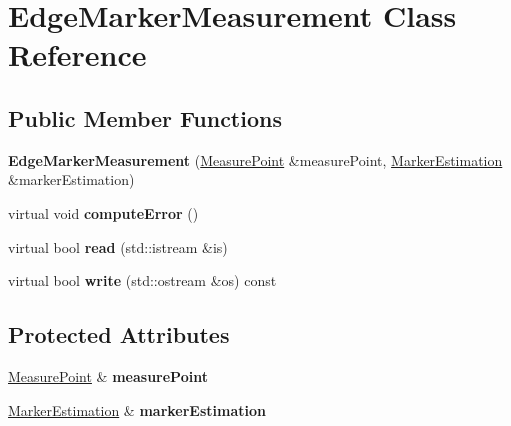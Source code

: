 \hypertarget{classEdgeMarkerMeasurement}{\section{\-Edge\-Marker\-Measurement \-Class \-Reference}
\label{classEdgeMarkerMeasurement}
}
\subsection*{\-Public \-Member \-Functions}
\begin{DoxyCompactItemize}
\item 
\hypertarget{classEdgeMarkerMeasurement_a66b96b376f59572a10bf25ea45989418}{{\bfseries \-Edge\-Marker\-Measurement} (\hyperlink{classCameraMeasurePoint}{\-Measure\-Point} \&measure\-Point, \hyperlink{classMarkerEstimation}{\-Marker\-Estimation} \&marker\-Estimation)}\label{classEdgeMarkerMeasurement_a66b96b376f59572a10bf25ea45989418}

\item 
\hypertarget{classEdgeMarkerMeasurement_af57e5dcfd6f1742990420364163dbc52}{virtual void {\bfseries compute\-Error} ()}\label{classEdgeMarkerMeasurement_af57e5dcfd6f1742990420364163dbc52}

\item 
\hypertarget{classEdgeMarkerMeasurement_a95396b4d4b56fb4d108de6c36acdf57a}{virtual bool {\bfseries read} (std\-::istream \&is)}\label{classEdgeMarkerMeasurement_a95396b4d4b56fb4d108de6c36acdf57a}

\item 
\hypertarget{classEdgeMarkerMeasurement_a9027128d76b86004d3fb2fc065328cf1}{virtual bool {\bfseries write} (std\-::ostream \&os) const }\label{classEdgeMarkerMeasurement_a9027128d76b86004d3fb2fc065328cf1}

\end{DoxyCompactItemize}
\subsection*{\-Protected \-Attributes}
\begin{DoxyCompactItemize}
\item 
\hypertarget{classEdgeMarkerMeasurement_a04b8a29d135d3c5687e195fc27785575}{\hyperlink{classCameraMeasurePoint}{\-Measure\-Point} \& {\bfseries measure\-Point}}\label{classEdgeMarkerMeasurement_a04b8a29d135d3c5687e195fc27785575}

\item 
\hypertarget{classEdgeMarkerMeasurement_a4f8c0a995405bac1af1bc7f47db23a50}{\hyperlink{classMarkerEstimation}{\-Marker\-Estimation} \& {\bfseries marker\-Estimation}}\label{classEdgeMarkerMeasurement_a4f8c0a995405bac1af1bc7f47db23a50}

\end{DoxyCompactItemize}


